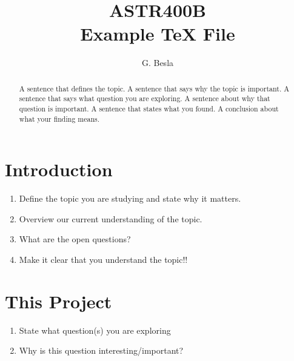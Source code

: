 \documentclass[iop]{emulateapj}
\begin{document}

\title{ASTR400B \\
    Example TeX File}

\author{G. Besla }



\begin{abstract}
A sentence that defines the topic.  A sentence that says why the topic is important. A sentence that says what question you are exploring. A sentence about why that question is important. A sentence that states what you found.
A conclusion about what your finding means. 
\end{abstract}


\section{Introduction}

\begin{enumerate}
	\item  Define the topic you are studying and state why it matters. 
	\item Overview our current understanding of the topic. 
	\item What are the open questions?
	\item Make it clear that you understand the topic!!
\end{enumerate}


\section{This Project} 

\begin{enumerate}
	\item State what question(s) you are exploring
	\item Why is this question interesting/important? 
\end{enumerate}
\end{document}
